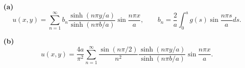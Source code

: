 \noindent\textbf{(a)} \[u(x,y)=\sum_{n=1}^{\infty}b_n\frac{\sinh(n\pi y/a)}{\sinh(n\pi b/a)}\sin\frac{n\pi x}{a},\qquad
b_n=\frac2a\int_0^a g(s)\sin\frac{n\pi s}{a}ds.\]

\noindent\textbf{(b)} \[u(x,y)=\frac{4a}{\pi^2}\sum_{n=1}^{\infty}\frac{\sin(n\pi/2)}{n^2}
\frac{\sinh(n\pi y/a)}{\sinh(n\pi b/a)}\sin\frac{n\pi x}{a}.\]
